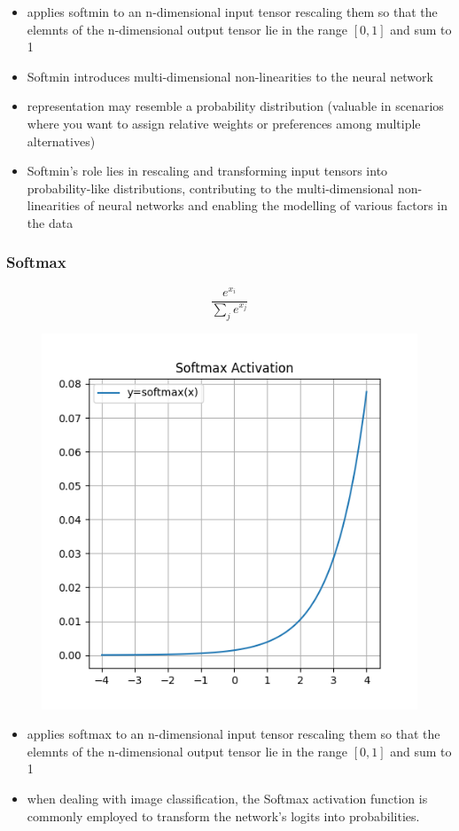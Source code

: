 \documentclass[11pt]{article}
\begin{document}
\begin{itemize}
    \item applies softmin to an n-dimensional input tensor rescaling them so that the elemnts of the n-dimensional output tensor lie in the range $[0,1]$ and sum to 1
    \item Softmin introduces multi-dimensional non-linearities to the neural network
    \item representation may resemble a probability distribution (valuable in scenarios where you want to assign relative weights or preferences among multiple alternatives)
    \item Softmin's role lies in rescaling and transforming input tensors into probability-like distributions, contributing to the multi-dimensional non-linearities of neural networks and enabling the modelling of various factors in the data
\end{itemize}

\subsubsection{Softmax}

\begin{definition}\label{eq:activation-softmax}
    \begin{equation*}
        \frac{e^{x_i}}{\sum_j e^{x_j}}
    \end{equation*}
\end{definition}

\begin{figure}[H]
    \centering
    \includegraphics*[width=.4\linewidth]{figures/Softmax Activation.png}\label{fig:softmax}
\end{figure}

\begin{itemize}
    \item applies softmax to an n-dimensional input tensor rescaling them so that the elemnts of the n-dimensional output tensor lie in the range $[0,1]$ and sum to 1
    \item when dealing with image classification, the Softmax activation function is commonly employed to transform the network's logits into probabilities.
\end{itemize}
\end{document}
